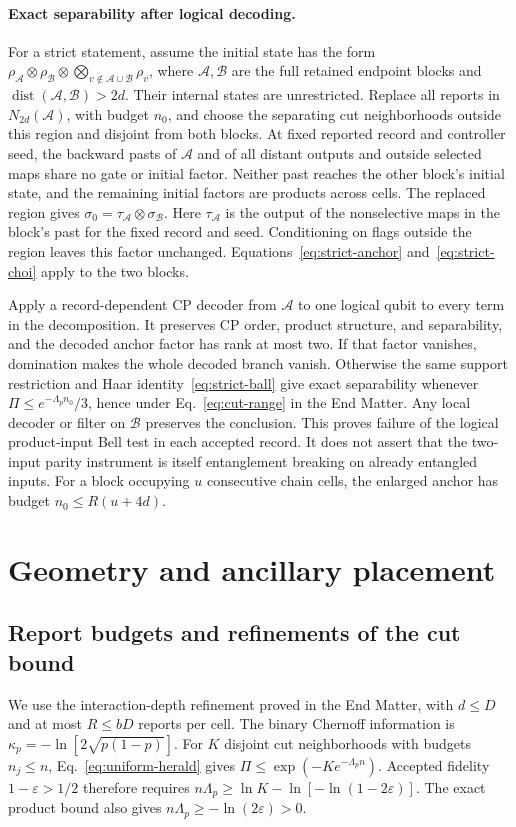 \documentclass[aps,prl,twocolumn,superscriptaddress,longbibliography,reprint,floatfix]{revtex4-2}
\newcommand{\eps}{\varepsilon}
\begin{document}
\paragraph*{Exact separability after logical decoding.}
For a strict statement, assume the initial state has the form
$\rho_{\mathcal A}\otimes\rho_{\mathcal B}\otimes
\bigotimes_{v\notin\mathcal A\cup\mathcal B}\rho_v$,
where $\mathcal A,\mathcal B$ are the full retained endpoint blocks
and $\operatorname{dist}(\mathcal A,\mathcal B)>2d$.
Their internal states are unrestricted. Replace all reports in
$N_{2d}(\mathcal A)$, with budget $n_0$, and choose the separating
cut neighborhoods outside this region and disjoint from both blocks.
At fixed reported record and controller seed, the backward pasts of
$\mathcal A$ and of all distant outputs and outside selected maps share
no gate or initial factor. Neither past reaches the other block's initial state, and the
remaining initial factors are products across cells.
The replaced region gives $\sigma_0=\tau_{\mathcal A}\otimes\sigma_{\mathcal B}$.
Here $\tau_{\mathcal A}$ is the output of the nonselective maps in the
block's past for the fixed record and seed. Conditioning on flags
outside the region leaves this factor unchanged. Equations~\eqref{eq:strict-anchor}
and~\eqref{eq:strict-choi} apply to the two blocks.

Apply a record-dependent CP decoder from $\mathcal A$ to one logical
qubit to every term in the decomposition. It preserves CP order,
product structure, and separability, and the decoded anchor factor has
rank at most two. If that factor vanishes, domination makes the whole
decoded branch vanish. Otherwise the same support restriction and Haar
identity~\eqref{eq:strict-ball} give exact separability whenever
$\Pi\le e^{-\Lambda_p n_0}/3$, hence under Eq.~\eqref{eq:cut-range} in the End Matter.
Any local decoder or filter on $\mathcal B$ preserves the conclusion.
This proves failure of the logical product-input Bell test in each
accepted record. It does not assert that the two-input parity instrument
is itself entanglement breaking on already entangled inputs.
For a block occupying $u$ consecutive chain cells, the enlarged
anchor has budget $n_0\le R(u+4d)$.

\FloatBarrier
\section{Geometry and ancillary placement}
\label{sm:geometry}
\subsection{Report budgets and refinements of the cut bound}
We use the interaction-depth refinement proved in the End Matter,
with $d\le D$ and at most $R\le bD$ reports per cell. The binary
Chernoff information is $\kappa_p=-\ln[2\sqrt{p(1-p)}]$.
For $K$ disjoint cut neighborhoods with budgets $n_j\le n$,
Eq.~\eqref{eq:uniform-herald} gives
$\Pi\le\exp(-K e^{-\Lambda_p n})$.
Accepted fidelity $1-\eps>1/2$ therefore requires
$n\Lambda_p\ge\ln K-\ln[-\ln(1-2\eps)]$.
The exact product bound also gives $n\Lambda_p\ge-\ln(2\eps)>0$.
\end{document}
